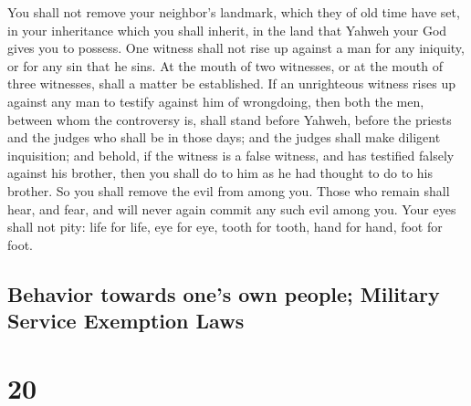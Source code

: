  You shall not remove your neighbor's landmark, which
they of old time have set, in your inheritance which you shall inherit,
in the land that Yahweh your God gives you to possess. 
One witness shall not rise up against a man for any iniquity, or for any
sin that he sins. At the mouth of two witnesses, or at the mouth of
three witnesses, shall a matter be established.  If an
unrighteous witness rises up against any man to testify against him of
wrongdoing,  then both the men, between whom the
controversy is, shall stand before Yahweh, before the priests and the
judges who shall be in those days;  and the judges shall
make diligent inquisition; and behold, if the witness is a false
witness, and has testified falsely against his brother, 
then you shall do to him as he had thought to do to his brother. So you
shall remove the evil from among you.  Those who remain
shall hear, and fear, and will never again commit any such evil among
you.  Your eyes shall not pity: life for life, eye for
eye, tooth for tooth, hand for hand, foot for foot.

\hypertarget{behavior-towards-ones-own-people-military-service-exemption-laws}{%
\subsection{Behavior towards one's own people; Military Service
Exemption
Laws}\label{behavior-towards-ones-own-people-military-service-exemption-laws}}

\hypertarget{section-19}{%
\section{20}\label{section-19}}

